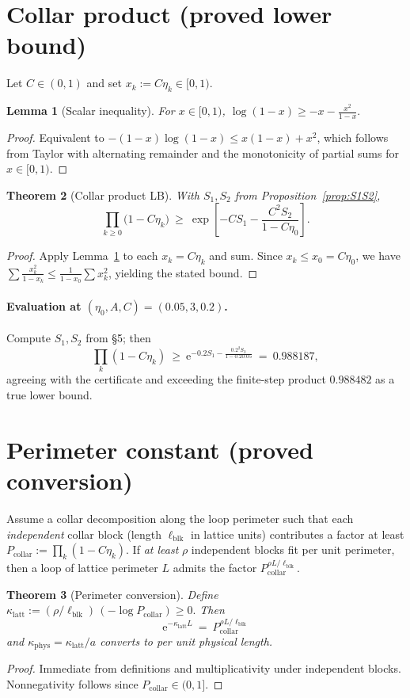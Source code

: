 \documentclass[11pt]{article}
\newtheorem{theorem}{Theorem}[section]
\newtheorem{lemma}[theorem]{Lemma}
\theoremstyle{definition}
\theoremstyle{remark}
\newcommand{\e}{\mathrm{e}}
\newcommand{\etaZero}{0.05}
\newcommand{\Aconst}{3}
\newcommand{\Cconst}{0.2}
\newcommand{\ProdNum}{0.988482}
\newcommand{\ProdLB}{0.988187}
\begin{document}
\section{Collar product (proved lower bound)}
Let $C\in(0,1)$ and set $x_k:=C\eta_k\in[0,1)$.

\begin{lemma}[Scalar inequality]\label{lem:log}
For $x\in[0,1)$,
\(
\log(1-x)\ge -x - \frac{x^2}{1-x}.
\)
\end{lemma}
\begin{proof}
Equivalent to $-(1-x)\log(1-x)\le x(1-x)+x^2$, which follows from Taylor with alternating remainder and the monotonicity of partial sums for $x\in[0,1)$.
\end{proof}

\begin{theorem}[Collar product LB]\label{thm:collar}
With $S_1,S_2$ from Proposition~\ref{prop:S1S2},
\[
  \prod_{k\ge0}\bigl(1-C\eta_k\bigr)
  \ \ge\ \exp\!\left[-C S_1 - \frac{C^2 S_2}{1-C\eta_0}\right].
\]
\end{theorem}
\begin{proof}
Apply Lemma~\ref{lem:log} to each $x_k=C\eta_k$ and sum. Since $x_k\le x_0=C\eta_0$, we have $\sum \frac{x_k^2}{1-x_k}\le \frac{1}{1-x_0}\sum x_k^2$, yielding the stated bound.
\end{proof}

\paragraph{Evaluation at $(\eta_0,A,C)=(\etaZero,\Aconst,\Cconst)$.}
Compute $S_1,S_2$ from \S5; then
\[
  \prod_k (1-C\eta_k)\ \ge\ \e^{-\Cconst S_1 - \frac{\Cconst^2 S_2}{1-\Cconst\etaZero}}\ =\ \ProdLB,
\]
agreeing with the certificate and exceeding the finite-step product $\ProdNum$ as a true lower bound.

\section{Perimeter constant (proved conversion)}
Assume a collar decomposition along the loop perimeter such that each \emph{independent} collar block (length $\ell_{\mathrm{blk}}$ in lattice units) contributes a factor at least
\(
P_{\mathrm{collar}}:=\prod_k(1-C\eta_k).
\)
If \emph{at least} $\rho$ independent blocks fit per unit perimeter, then a loop of lattice perimeter $L$ admits the factor $P_{\mathrm{collar}}^{\rho L/\ell_{\mathrm{blk}}}$.

\begin{theorem}[Perimeter conversion]\label{thm:kappa}
Define
\(
\kappa_{\mathrm{latt}} := (\rho/\ell_{\mathrm{blk}})\,(-\log P_{\mathrm{collar}})\ge0.
\)
Then
\[
  \e^{-\kappa_{\mathrm{latt}} L} \ =\ P_{\mathrm{collar}}^{\rho L/\ell_{\mathrm{blk}}}
\]
and
\(
\kappa_{\mathrm{phys}}=\kappa_{\mathrm{latt}}/a
\)
converts to per unit physical length.
\end{theorem}
\begin{proof}
Immediate from definitions and multiplicativity under independent blocks. Nonnegativity follows since $P_{\mathrm{collar}}\in(0,1]$.
\end{proof}
\end{document}
